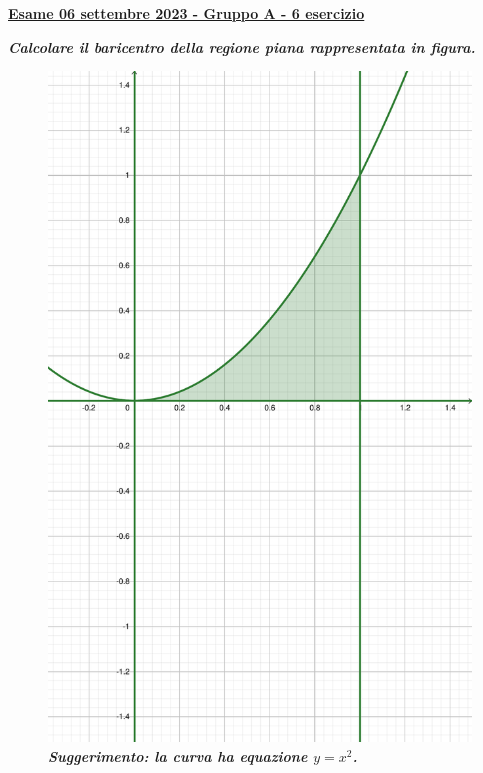 \documentclass[a4paper]{article}
\newcommand{\definition}[1]{\textcolor{Red3}{\textbf{#1}}}
\newcommand{\example}[1]{\textcolor{Green4}{\textbf{#1}}}
\begin{document}
	\begin{flushleft}
		\label{exam: esame 06 settembre 2023 - Gruppo A - 6 esercizio}
		\hypertarget{
			exam: esame 06 settembre 2023 - Gruppo A - 6 esercizio
		}{
			\definition{\underline{Esame 06 settembre 2023 - Gruppo A - 6 esercizio}}
		}
	\end{flushleft}
	\example{\emph{Calcolare il baricentro della regione piana rappresentata in figura.}}
	\begin{figure}[!htp]
		\centering
		\includegraphics[width=.55\textwidth]{img/exercise/2023-09-06-A-ex6.pdf}
		\caption*{\example{\emph{Suggerimento: la curva ha equazione $y = x^{2}$.}}}
	\end{figure}
\end{document}

